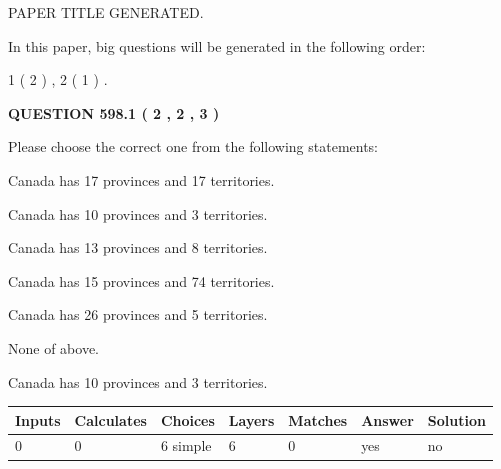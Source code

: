 \documentclass[12pt]{article}
\begin{document}
   
\vspace{0.2in}
   
   
   
   
   
   
   
   
 \vspace{0.2in}
 
 
 
 
   
   
 PAPER TITLE GENERATED.
   
   
   
\vspace{0.2in}
   
In this paper, big questions will be generated in the following order: 
   
   
   1 ( 2 )
 ,
   2 ( 1 )
 .
  
\vspace{0.2in}
  
{\textbf{\Large{QUESTION
598.1 
 ( 2 , 2 , 3 )
}}}
  
  
Please choose the correct one from the following statements:
 
 
Canada has  17 provinces and  17 territories.
 
 
Canada has 10  provinces and 3 territories.
 
 
Canada has  13 provinces and  8 territories.
 
 
Canada has  15 provinces and  74 territories.
 
 
Canada has  26 provinces and  5 territories.
 
 
 None of above.
 
 
\noindent{}
 
 
Canada has 10  provinces and 3 territories.
 
 
\noindent{}
 
 
   
   
   
   
\noindent\begin{tabular}{|l|l|l|l|l|l|l|}
 \hline
Inputs & Calculates & Choices & Layers & Matches & Answer & Solution \\ \hline
 0  & 
 0  & 
 6
  simple  
  & 
 6  & 
 0  & 
  yes & 
  no 
  \\ \hline
 \end{tabular}
   
\end{document}
